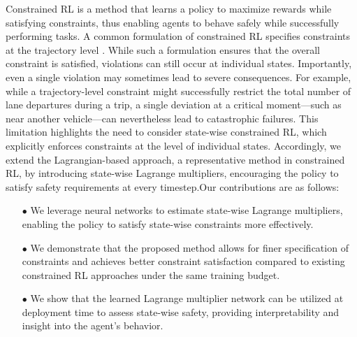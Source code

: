 Constrained RL is a method that learns a policy to maximize rewards while satisfying constraints, thus enabling agents to behave safely while successfully performing tasks.
A common formulation of constrained RL specifies constraints at the trajectory level \cite{brunke2022safe}.
While such a formulation ensures that the overall constraint is satisfied, violations can still occur at individual states.
Importantly, even a single violation may sometimes lead to severe consequences.
For example, while a trajectory-level constraint might successfully restrict the total number of lane departures during a trip, a single deviation at a critical moment---such as near another vehicle---can nevertheless lead to catastrophic failures.
This limitation highlights the need to consider state-wise constrained RL, which explicitly enforces constraints at the level of individual states.
Accordingly, we extend the Lagrangian-based approach, a representative method in constrained RL, by introducing state-wise Lagrange multipliers, encouraging the policy to satisfy safety requirements at every timestep.Our contributions are as follows:
\begin{itemize}
    \item[$\bullet$] We leverage neural networks to estimate state-wise Lagrange multipliers, enabling the policy to satisfy state-wise constraints more effectively.
    \item[$\bullet$] We demonstrate that the proposed method allows for finer specification of constraints and achieves better constraint satisfaction compared to existing constrained RL approaches under the same training budget.
    \item[$\bullet$] We show that the learned Lagrange multiplier network can be utilized at deployment time to assess state-wise safety, providing interpretability and insight into the agent’s behavior.
\end{itemize}